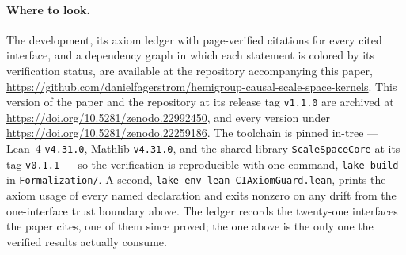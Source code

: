 \paragraph{Where to look.} The development, its axiom ledger with page-verified citations
for every cited interface, and a dependency graph in which each statement is colored by its
verification status, are available at the repository accompanying this paper,
\url{https://github.com/danielfagerstrom/hemigroup-causal-scale-space-kernels}. This
version of the paper and the repository at its release tag \texttt{v1.1.0} are archived at
\url{https://doi.org/10.5281/zenodo.22992450}, and every version under
\url{https://doi.org/10.5281/zenodo.22259186}. The
toolchain is pinned in-tree --- Lean~4 \texttt{v4.31.0}, Mathlib \texttt{v4.31.0}, and the
shared library \texttt{ScaleSpaceCore} at its tag \texttt{v0.1.1} --- so the verification
is reproducible with one command, \texttt{lake build} in \texttt{Formalization/}. A second,
\texttt{lake env lean CIAxiomGuard.lean}, prints the axiom usage of every named declaration
and exits nonzero on any drift from the one-interface trust boundary above. The ledger
records the twenty-one interfaces the paper cites, one of them since proved; the one above is
the only one the verified results actually consume.
